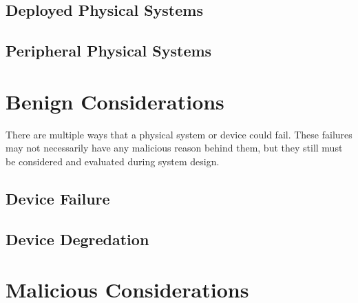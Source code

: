 \subsection*{Deployed Physical Systems}

\subsection*{Peripheral Physical Systems}


\section{Benign Considerations}
There are multiple ways that a physical system or device could fail. These failures may not necessarily have
any malicious reason behind them, but they still must be considered and evaluated during system design.


\subsection{Device Failure}

\subsection{Device Degredation}

\section{Malicious Considerations}

